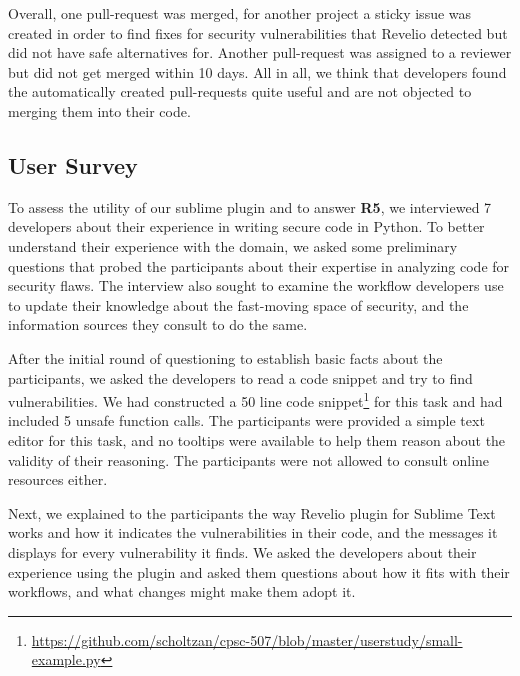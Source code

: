 Overall, one pull-request was merged, for another project a sticky issue was created in order to find fixes for security vulnerabilities that Revelio detected but did not have safe alternatives for. Another pull-request was assigned to a reviewer but did not get merged within 10 days. All in all, we think that developers found the automatically created pull-requests quite useful and are not objected to merging them into their code.

\subsection{User Survey}

To assess the utility of our sublime plugin and to answer \textbf{R5}, we interviewed 7 developers about their experience in writing secure code in Python. To better understand their experience with the domain, we asked some preliminary questions that probed the participants about their expertise in analyzing code for security flaws. The interview also sought to examine the workflow developers use to update their knowledge about the fast-moving space of security, and the information sources they consult to do the same.

After the initial round of questioning to establish basic facts about the participants, we asked the developers to read a code snippet and try to find vulnerabilities. We had constructed a 50 line code snippet\footnote{\url{https://github.com/scholtzan/cpsc-507/blob/master/userstudy/small-example.py}} for this task and had included 5 unsafe function calls. The participants were provided a simple text editor for this task, and no tooltips were available to help them reason about the validity of their reasoning. The participants were not allowed to consult online resources either. 

Next, we explained to the participants the way Revelio plugin for Sublime Text works and how it indicates the vulnerabilities in their code, and the messages it displays for every vulnerability it finds. We asked the developers about their experience using the plugin and asked them questions about how it fits with their workflows, and what changes might make them adopt it.


